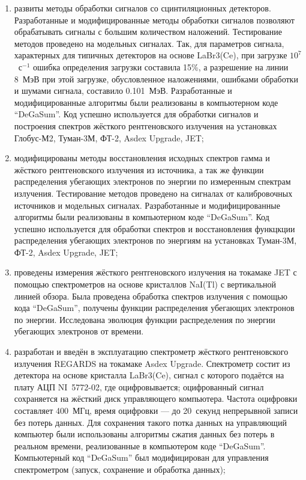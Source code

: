 \begin{enumerate}
  \item развиты методы обработки сигналов со сцинтиляционных детекторов. Разработанные и модифицированные методы обработки сигналов позволяют обрабатывать сигналы с большим количеством наложений. Тестирование методов проведено на модельных сигналах. Так, для параметров сигнала, характерных для типичных детекторов на основе LaBr3(Ce), при загрузке $10^7$~с${}^{-1}$ ошибка определения загрузки составила 15\%, а разрешение на линии 8~МэВ при этой загрузке, обусловленное наложениями, ошибками обработки и шумами сигнала, составило 0.101~МэВ. Разработанные и модифицированные алгоритмы были реализованы в компьютерном коде ``DeGaSum''. Код успешно используется для обработки сигналов и построения спектров жёсткого рентгеновского излучения на установках Глобус-М2, Туман-3М, ФТ-2, Asdex Upgrade, JET;

  \item модифицированы методы восстановления исходных спектров гамма и жёсткого рентгеновского излучения из источника, а так же функции распределения убегающих электронов по энергии по измеренным спектрам излучения. Тестирование методов проведено на сигналах от калибровочных источников и модельных сигналах. Разработанные и модифицированные алгоритмы были реализованы в компьютерном коде ``DeGaSum''. Код успешно используется для обработки спектров и восстановления функцкции распределения убегающих электронов по энергиям на установках Туман-3М, ФТ-2, Asdex Upgrade, JET;
  
  \item проведены измерения жёсткого рентгеновского излучения на токамаке JET с помощью спектрометров на основе кристаллов NaI(Tl) с вертикальной линией обзора. Была проведена обработка спектров излучения с помощью кода ``DeGaSum'', получены функции распределения убегающих электронов по энергии. Исследована эволюция функции распределения по энергии убегающих электронов от времени.

  \item разработан и введён в эксплуатацию спектрометр жёсткого рентгеновского излучения REGARDS на токамаке Asdex Upgrade. Спектрометр состит из детектора на основе кристалла LaBr3(Ce), сигнал с которого подаётся на плату АЦП NI~5772-02, где оцифровывается; оцифрованный сигнал сохраняется на жёсткий диск управляющего компьютера. Частота оцифровки составляет 400~МГц, время оцифровки --- до 20~секунд непрерывной записи без потерь данных. Для сохранения такого потка данных на управляющий компьютер были использованы алгоритмы сжатия данных без потерь в реальном времени, реализованные в компьютером коде ``DeGaSum''. Компьютерный код ``DeGaSum'' был модифицирован для управления спектрометром (запуск, сохранение и обработка данных);


\end{enumerate}
